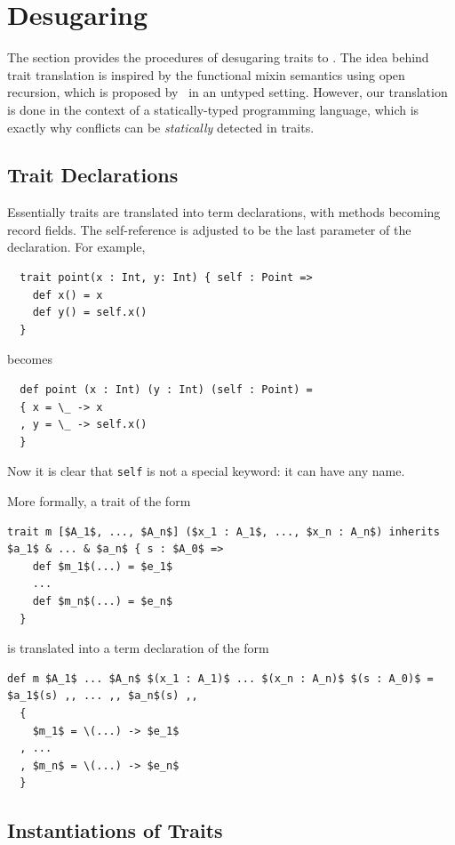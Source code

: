 \section{Desugaring}
\label{sec:desugar}


The section provides the procedures of desugaring traits to \bname. The idea
behind trait translation is inspired by the functional mixin semantics using
open recursion, which is proposed by~\citet{cook1989denotational} in an untyped
setting. However, our translation is done in the context of a statically-typed
programming language, which is exactly why conflicts can be \textit{statically}
detected in traits.

\subsection{Trait Declarations}

Essentially traits are translated into term declarations, with methods becoming
record fields. The self-reference is adjusted to be the last parameter of the
declaration. For example,
\begin{lstlisting}
  trait point(x : Int, y: Int) { self : Point =>
    def x() = x
    def y() = self.x()
  }
\end{lstlisting}
becomes
\begin{lstlisting}
  def point (x : Int) (y : Int) (self : Point) =
  { x = \_ -> x
  , y = \_ -> self.x()
  }
\end{lstlisting}

Now it is clear that \lstinline{self} is not a special keyword: it can
have any name.

More formally, a trait of the form
\begin{lstlisting}[mathescape=true]
  trait m [$A_1$, ..., $A_n$] ($x_1 : A_1$, ..., $x_n : A_n$) inherits $a_1$ & ... & $a_n$ { s : $A_0$ =>
    def $m_1$(...) = $e_1$
    ...
    def $m_n$(...) = $e_n$
  }
\end{lstlisting}
is translated into a term declaration of the form
\begin{lstlisting}[mathescape=true]
  def m $A_1$ ... $A_n$ $(x_1 : A_1)$ ... $(x_n : A_n)$ $(s : A_0)$ = $a_1$(s) ,, ... ,, $a_n$(s) ,,
  {
    $m_1$ = \(...) -> $e_1$
  , ...
  , $m_n$ = \(...) -> $e_n$
  }
\end{lstlisting}


\subsection{Instantiations of Traits}

